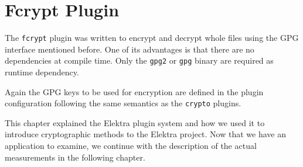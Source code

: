 \section{Fcrypt Plugin}\label{fcrypt-plugin}

The \texttt{fcrypt} plugin was written to encrypt and decrypt whole files using the GPG interface mentioned before.
One of its advantages is that there are no dependencies at compile time.
Only the \texttt{gpg2} or \texttt{gpg} binary are required as runtime dependency.

Again the GPG keys to be used for encryption are defined in the plugin configuration following the same semantics as the \texttt{crypto} plugins.

This chapter explained the Elektra plugin system and how we used it to introduce cryptographic methods to the Elektra project.
Now that we have an application to examine, we continue with the description of the actual measurements in the following chapter.
